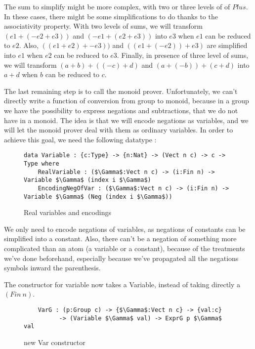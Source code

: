 The sum to simplify might be more complex, with two or three levels of of $Plus$. In these cases, there might be some simplifications to do thanks to the associativity property. With two levels of sums, we will transform $(e1 + (-e2 + e3))$ and $(-e1 + (e2+e3))$ into $e3$ when $e1$ can be reduced to $e2$. Also, $((e1+e2) + -e3))$ and $((e1+(-e2)) + e3)$ are simplified into $e1$ when $e2$ can be reduced to $e3$. Finally, in presence of three level of sums, we will transform $(a+b) + ((-c)+d)$ and $(a+(-b)) + (c+d)$ into $a+d$ when $b$ can be reduced to $c$.

The last remaining step is to call the monoid prover. Unfortunately, we can't directly write a function of conversion from group to monoid, because in a group we have the possibility to express negations and subtractions, that we do not have in a monoid. The idea is that we will encode negations as variables, and we will let the monoid prover deal with them as ordinary variables. In order to achieve this goal, we need the following datatype :


\begin{figure}[H]
\figrule
\begin{center}
\begin{lstlisting}
data Variable : {c:Type} -> {n:Nat} -> (Vect n c) -> c -> Type where
    RealVariable : ($\Gamma$:Vect n c) -> (i:Fin n) -> Variable $\Gamma$ (index i $\Gamma$)
    EncodingNegOfVar : ($\Gamma$:Vect n c) -> (i:Fin n) -> Variable $\Gamma$ (Neg (index i $\Gamma$))
\end{lstlisting}
\end{center}
\caption{Real variables and encodings}
\label{Variable}
\figrule
\end{figure}

We only need to encode negations of variables, as negations of constants can be simplified into a constant. Also, there can't be a negation of something more complicated than an atom (a variable or a constant), because of the treatments we've done beforehand, especially because we've propagated all the negations symbols inward the parenthesis.

The constructor for variable now takes a Variable, instead of taking directly a $(Fin\ n)$.
\begin{figure}[H]
\figrule
\begin{center}
\begin{lstlisting}
    VarG : (p:Group c) -> {$\Gamma$:Vect n c} -> {val:c} 
          -> (Variable $\Gamma$ val) -> ExprG p $\Gamma$ val
\end{lstlisting}
\end{center}
\caption{new Var constructor}
\label{VarG}
\figrule
\end{figure}

